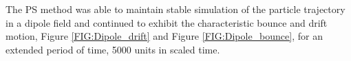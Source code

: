 \documentclass{article}
\begin{document}
The PS method was able to maintain stable simulation of the particle trajectory in a dipole field and continued to exhibit the characteristic bounce 
 and drift motion, Figure \ref{FIG:Dipole_drift} and Figure \ref{FIG:Dipole_bounce}, for an extended period of time, 5000 units in scaled time.
\end{document}
